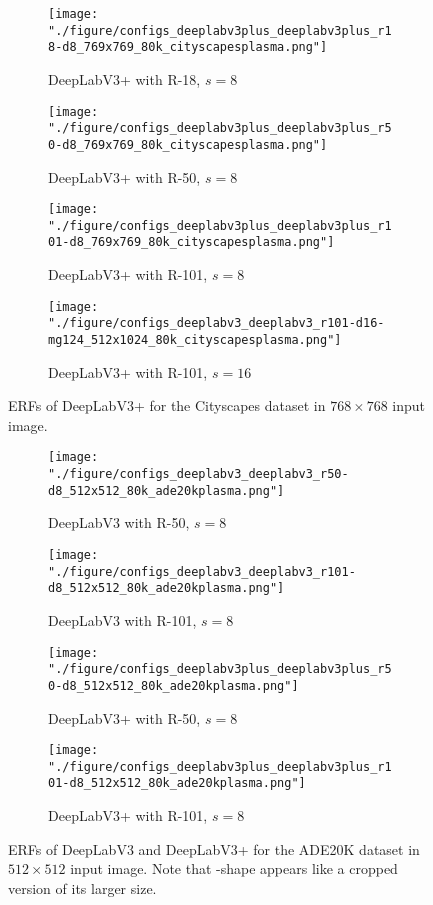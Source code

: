 \documentclass{article}
\begin{document}
\begin{figure}[t!]
	\centering
	\begin{subfigure}[b]{0.241\linewidth}
		\centering
		\texttt{[image: "./figure/configs\_deeplabv3plus\_deeplabv3plus\_r18-d8\_769x769\_80k\_cityscapesplasma.png"]}
		\caption{DeepLabV3+ with R-18, $s=8$}
	\end{subfigure}
	\hfill
	\begin{subfigure}[b]{0.241\linewidth}
		\centering
		\texttt{[image: "./figure/configs\_deeplabv3plus\_deeplabv3plus\_r50-d8\_769x769\_80k\_cityscapesplasma.png"]}
		\caption{DeepLabV3+ with R-50, $s=8$}
	\end{subfigure}
	\hfill
	\begin{subfigure}[b]{0.241\linewidth}
		\centering
		\texttt{[image: "./figure/configs\_deeplabv3plus\_deeplabv3plus\_r101-d8\_769x769\_80k\_cityscapesplasma.png"]}
		\caption{DeepLabV3+ with R-101, $s=8$}
	\end{subfigure}
	\hfill
	\begin{subfigure}[b]{0.241\linewidth}
		\centering
		\texttt{[image: "./figure/configs\_deeplabv3\_deeplabv3\_r101-d16-mg124\_512x1024\_80k\_cityscapesplasma.png"]}
		\caption{DeepLabV3+ with R-101, $s=16$}
	\end{subfigure}
	\caption{ERFs of DeepLabV3+ for the Cityscapes dataset in $768 \times 768$ input image.}
	\label{fig:d3p}
\end{figure}

\begin{figure}[t!]
	\centering
	\begin{subfigure}[b]{0.241\linewidth}
		\centering
		\texttt{[image: "./figure/configs\_deeplabv3\_deeplabv3\_r50-d8\_512x512\_80k\_ade20kplasma.png"]}
		\caption{DeepLabV3 with R-50, $s=8$}
	\end{subfigure}
	\hfill
	\begin{subfigure}[b]{0.241\linewidth}
		\centering
		\texttt{[image: "./figure/configs\_deeplabv3\_deeplabv3\_r101-d8\_512x512\_80k\_ade20kplasma.png"]}
		\caption{DeepLabV3 with R-101, $s=8$}
	\end{subfigure}
	\hfill
	\begin{subfigure}[b]{0.241\linewidth}
		\centering
		\texttt{[image: "./figure/configs\_deeplabv3plus\_deeplabv3plus\_r50-d8\_512x512\_80k\_ade20kplasma.png"]}
		\caption{DeepLabV3+ with R-50, $s=8$}
	\end{subfigure}
	\hfill
	\begin{subfigure}[b]{0.241\linewidth}
		\centering
		\texttt{[image: "./figure/configs\_deeplabv3plus\_deeplabv3plus\_r101-d8\_512x512\_80k\_ade20kplasma.png"]}
		\caption{DeepLabV3+ with R-101, $s=8$}
	\end{subfigure}
	\caption{ERFs of DeepLabV3 and DeepLabV3+ for the ADE20K dataset in $512 \times 512$ input image. Note that \EightStarTaper-shape appears like a cropped version of its larger size.}
	\label{fig:d3ade}
\end{figure}
\end{document}
